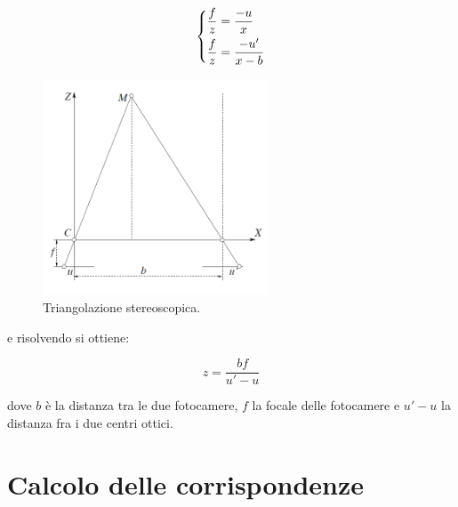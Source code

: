 \documentclass[12pt]{report}
\begin{document}
			\[
			\begin{dcases}
				\frac{f}{z}=\frac{-u}{x} \\
				\frac{f}{z}=\frac{-u'}{x-b}
			\end{dcases}
			\]
			
			\begin{figure}
				\includegraphics[width=0.6\textwidth]{./figures/Triangolazione_stereoscopica.png}
				\caption{Triangolazione stereoscopica.}
				\label{fig:triangolazione}
			\end{figure}
			
			e risolvendo si ottiene:

			\[
			z=\frac{bf}{u'-u}
			\]
			
			dove $b$ è la distanza tra le due fotocamere, $f$ la focale delle fotocamere e $u'-u$ la distanza fra i due centri ottici.
		
		
		\section{Calcolo delle corrispondenze}
		\label{sec:corrispondenze}
		
\end{document}
